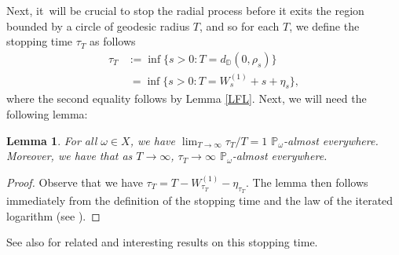 \documentclass[10pt]{amsart}
\theoremstyle{plain}
\newtheorem{lemma}[thm]{Lemma}
\theoremstyle{definition}
\numberwithin{equation}{subsection}
\newcommand\bD{\mathbb{D}}
\newcommand\bP{\mathbb{P}}
\newcommand{\defeq}{:=}
\begin{document}
Next, it~will be crucial to stop the radial process before it exits the region bounded by a circle of geodesic radius $T$, and so for each $T$, we define the stopping time $\tau_T$ as follows
\begin{align*}
\tau_T &\defeq \inf\{s>0 :T = d_{\bD}(0,\rho_s)\} \\
&~= \inf\{s>0 :T = W_s^{(1)} + s + \eta_{s}\},
\end{align*}
where the second equality follows by Lemma \ref{LFL}. Next, we will need the following lemma:
\begin{lemma}\label{taublah}
For all $\omega \in X$, we have $\lim_{T\to\infty} \tau_T/T = 1$ $\bP_\omega$-almost everywhere. Moreover, we have that as $T\to\infty$, $\tau_T \to \infty$ $\bP_\omega$-almost everywhere.

\end{lemma}
\begin{proof} Observe that we have $\tau_T = T - W_{\tau_T}^{(1)} - \eta_{\tau_T}$. The lemma then follows immediately from the definition of the stopping time and the law of the iterated logarithm (see \cite[Cor.\,II.1.12]{RY}).\end{proof}

See also \cite[Lem.\,4.2]{EFL01} for related and interesting results on this stopping time.
\end{document}
